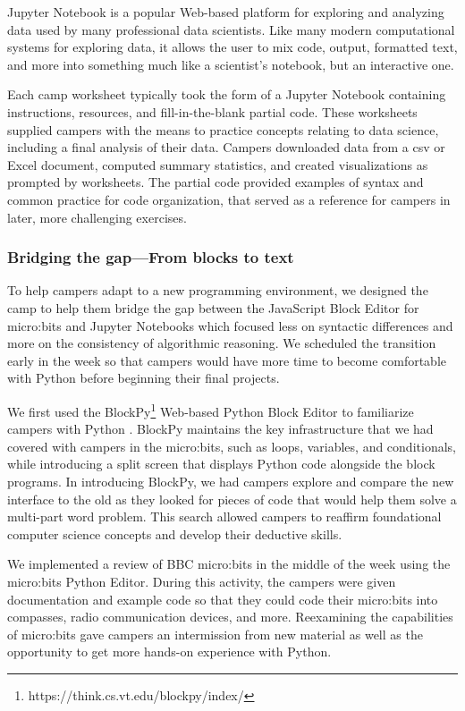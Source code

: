 Jupyter Notebook is a popular Web-based platform for exploring and
analyzing data used by many professional data scientists.  Like
many modern computational systems for exploring data, it allows the
user to mix code, output, formatted text, and more into something
much like a scientist's notebook, but an interactive one.

Each camp worksheet typically took the form of a Jupyter Notebook
containing instructions, resources, and fill-in-the-blank partial
code.  These worksheets supplied campers with the means to practice
concepts relating to data science, including a final analysis of
their data.  Campers downloaded data from a csv or Excel document,
computed summary statistics, and created visualizations as prompted
by worksheets. The partial code provided examples
of syntax and common practice for code organization, that served
as a reference for campers in later, more challenging exercises.

\subsubsection{Bridging the gap---From blocks to text}

To help campers adapt to a new programming environment, we designed
the camp to help them bridge the gap between the JavaScript Block
Editor for micro:bits and Jupyter Notebooks which focused less on
syntactic differences and more on the consistency of algorithmic
reasoning.  We scheduled the transition early in the week so that
campers would have more time to become comfortable with Python
before beginning their final projects.

We first used the BlockPy\footnote{https://think.cs.vt.edu/blockpy/index/}
Web-based Python Block Editor to familiarize campers with Python
\cite{Bart2017}.  BlockPy maintains the key infrastructure that we
had covered with campers in the micro:bits, such as loops, variables,
and conditionals, while introducing a split screen that displays
Python code alongside the block programs. In introducing BlockPy,
we had campers explore and compare the new interface to the old as
they looked for pieces of code that would help them solve a multi-part
word problem. This search allowed campers to reaffirm foundational
computer science concepts and develop their deductive skills.

We implemented a review of BBC micro:bits in the middle
of the week using the micro:bits Python Editor. During this activity,
the campers were given documentation and example code so that they
could code their micro:bits into compasses, radio communication
devices, and more. Reexamining the capabilities of micro:bits gave
campers an intermission from new material as well as the opportunity
to get more hands-on experience with Python.

